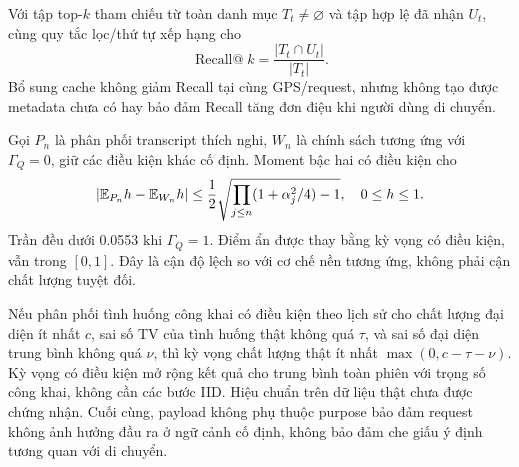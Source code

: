 Với tập top-$k$ tham chiếu từ toàn danh mục $T_t\ne\varnothing$ và tập hợp
lệ đã nhận $U_t$, cùng quy tắc lọc/thứ tự xếp hạng cho
\begin{equation}
\operatorname{Recall@}k=\frac{|T_t\cap U_t|}{|T_t|}. \label{eq:recall}
\end{equation}
Bổ sung cache không giảm Recall tại cùng GPS/request, nhưng không tạo được
metadata chưa có hay bảo đảm Recall tăng đơn điệu khi người dùng di chuyển.

Gọi $P_n$ là phân phối transcript thích nghi, $W_n$ là chính sách tương ứng
với $\Gamma_Q=0$, giữ các điều kiện khác cố định. Moment bậc hai có điều kiện cho
\begin{equation}
|\mathbb E_{P_n}h-\mathbb E_{W_n}h|
\le\frac12\sqrt{\prod_{j\le n}(1+\alpha_j^2/4)-1},
\quad 0\le h\le1. \label{eq:tv}
\end{equation}
Trần đều dưới 0.0553 khi $\Gamma_Q=1$. Điểm ẩn được thay bằng kỳ vọng có
điều kiện, vẫn trong $[0,1]$. Đây là cận độ lệch so với cơ chế nền tương ứng,
không phải cận chất lượng tuyệt đối.

Nếu phân phối tình huống công khai có điều kiện theo lịch sử cho chất lượng
đại diện ít nhất $c$, sai số TV của tình huống thật không quá $\tau$, và sai
số đại diện trung bình không quá $\nu$, thì kỳ vọng chất lượng thật ít nhất
$\max(0,c-\tau-\nu)$. Kỳ vọng có điều kiện mở rộng kết quả cho trung bình toàn
phiên với trọng số công khai, không cần các bước IID. Hiệu chuẩn trên dữ liệu
thật chưa được chứng nhận. Cuối cùng, payload không phụ thuộc purpose bảo
đảm request không ảnh hưởng đầu ra ở ngữ cảnh cố định, không bảo đảm che giấu
ý định tương quan với di chuyển.
